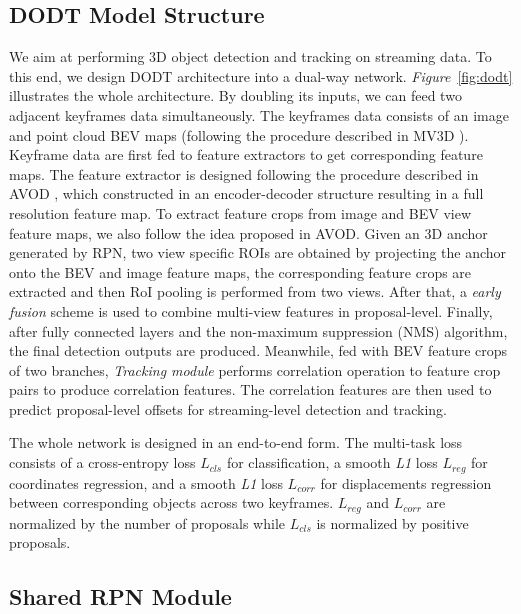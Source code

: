 \documentclass[letterpaper, 10 pt, conference]{ieeeconf}  %
\def\figurename{\emph{Figure}}
\begin{document}
\subsection{DODT Model Structure} 

We aim at performing 3D object detection and tracking on streaming data. To this end, we design DODT architecture into a dual-way network. \figurename \, \ref{fig:dodt} illustrates the whole architecture. By doubling its inputs, we can feed two adjacent keyframes data simultaneously. The keyframes data consists of an image and point cloud BEV maps (following the procedure described in MV3D \cite{chen2017multi}). Keyframe data are first fed to feature extractors to get corresponding feature maps. The feature extractor is designed following the procedure described in AVOD \cite{ku2018joint}, which constructed in an encoder-decoder structure resulting in a full resolution feature map. To extract feature crops from image and BEV view feature maps, we also follow the idea proposed in AVOD. Given an 3D anchor generated by RPN, two view specific ROIs are obtained by projecting the anchor onto the BEV and image feature maps, the corresponding feature crops are extracted and then RoI pooling is performed from two views. After that, a \textit{early fusion} scheme is used to combine multi-view features in proposal-level. Finally, after fully connected layers and the non-maximum suppression (NMS) algorithm, the final detection outputs are produced. Meanwhile, fed with BEV feature crops of two branches, \textit{Tracking module} performs correlation operation to feature crop pairs to produce correlation features. The correlation features are then used to predict proposal-level offsets for streaming-level detection and tracking.

The whole network is designed in an end-to-end form. The multi-task loss consists of a cross-entropy loss $L_{cls}$ for classification, a smooth \textit{L1} loss $L_{reg}$ for coordinates regression, and a smooth \textit{L1} loss $L_{corr}$ for displacements regression between corresponding objects across two keyframes. $L_{reg}$ and $L_{corr}$ are normalized by the number of proposals while $L_{cls}$ is normalized by positive proposals.

\subsection{Shared RPN Module}
\end{document}
